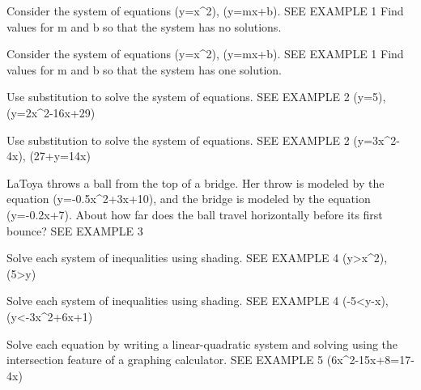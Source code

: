 \documentclass{article}
\newenvironment{practice}[2]{}{}        %
\newcommand{\answer}[1]{}               %
\newcommand{\placeholder}[2]{}          %
\begin{document}
\begin{practice}{14}{2}
Consider the system of equations (y=x^2), (y=mx+b). SEE EXAMPLE 1
Find values for m and b so that the system has no solutions.
\answer{Answers may vary. Sample: (m=0), (b=-3)}
\end{practice}
\begin{practice}{15}{2}
Consider the system of equations (y=x^2), (y=mx+b). SEE EXAMPLE 1
Find values for m and b so that the system has one solution.
\answer{Answers may vary. Sample: (m=0), (b=0)}
\end{practice}
\begin{practice}{16}{1}
Use substitution to solve the system of equations. SEE EXAMPLE 2
(y=5), (y=2x^2-16x+29)
\answer{(6,5) and (2,5)}
\end{practice}
\begin{practice}{17}{1}
Use substitution to solve the system of equations. SEE EXAMPLE 2
(y=3x^2-4x), (27+y=14x)
\answer{(3,15)}
\end{practice}
\begin{practice}{18}{2}
LaToya throws a ball from the top of a bridge. Her throw is modeled by the equation (y=-0.5x^2+3x+10), and the bridge is modeled by the equation (y=-0.2x+7). About how far does the ball travel horizontally before its first bounce? SEE EXAMPLE 3
\answer{about 7.23 ft}
\end{practice}
\begin{practice}{19}{1}
Solve each system of inequalities using shading. SEE EXAMPLE 4
(y>x^2), (5>y)
\answer{See graph.}
\placeholder{graph}{Answer graph on page 111: dashed red upward parabola (y=x^2), yellow shading above, and dashed blue horizontal line y=5, blue shading below. Green overlap above parabola and below y=5, -sqrt5<x<sqrt5. Window x=[-5,5], y=[-2,8], unit grid, x labels -4,-2,O,2,4, y labels 2,4,6; axes x,y arrowed, curve ends arrowed; boundaries excluded.}
\end{practice}
\begin{practice}{20}{1}
Solve each system of inequalities using shading. SEE EXAMPLE 4
(-5<y-x), (y<-3x^2+6x+1)
\answer{See graph.}
\placeholder{graph}{Answer graph on page 111: dashed red downward parabola (y=-3x^2+6x+1), vertex (1,4), yellow shading below; dashed blue line (y=x-5), blue shading above. Green overlap between the curves. Unit grid x,y=[-5,5]; x labels -4,-2,O,2,4, y labels -4,-2,2,4; arrowed x,y axes and curves; boundaries excluded.}
\end{practice}
\begin{practice}{21}{1}
Solve each equation by writing a linear-quadratic system and solving using the intersection feature of a graphing calculator. SEE EXAMPLE 5
(6x^2-15x+8=17-4x)
\answer{(x\approx-0.61), (x\approx2.45)}
\end{practice}
\end{document}
